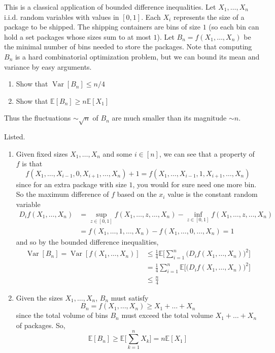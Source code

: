\documentclass{article}
\DeclareMathOperator{\Var}{Var}
\theoremstyle{definition}
\theoremstyle{remark}
\theoremstyle{definition}
\begin{document}
  \begin{exercise}
  This is a classical application of bounded difference inequalities. Let $X_1, \ldots, X_n$ i.i.d. random variables with values in $[0, 1]$. Each $X_i$ represents the size of a package to be shipped. The shipping containers are bins of size $1$ (so each bin can hold a set packages whose sizes sum to at most $1$). Let $B_n = f(X_1, \ldots, X_n)$ be the minimal number of bins needed to store the packages. Note that computing $B_n$ is a hard combinatorial optimization problem, but we can bound its mean and variance by easy arguments. 
  \begin{enumerate}
      \item Show that $\Var[B_n] \leq n/4$
      \item Show that $\mathbb{E}[B_n] \geq n \mathbb{E}[X_1]$
  \end{enumerate}
  Thus the fluctuations $\sim \sqrt{n}$ of $B_n$ are much smaller than its magnitude $\sim n$. 
  \end{exercise}
  \begin{solution}
  Listed. 
  \begin{enumerate}
      \item Given fixed sizes $X_1, \ldots, X_n$ and some $i \in [n]$, we can see that a property of $f$ is that 
      \[f(X_1, \ldots, X_{i-1}, 0, X_{i+1}, \ldots, X_n) + 1 = f(X_1, \ldots, X_{i-1}, 1, X_{i+1}, \ldots, X_n)\]
      since for an extra package with size $1$, you would for sure need one more bin. So the maximum difference of $f$ based on the $x_i$ value is the constant random variable 
      \begin{align*}
          D_i f(X_1, \ldots, X_n) & = \sup_{z \in [0, 1]} f(X_1, \ldots, z, \ldots, X_n) - \inf_{z \in [0, 1]} f(X_1, \ldots, z, \ldots, X_n)\\
          & = f(X_1, \ldots, 1, \ldots, X_n) - f(X_1, \ldots, 0, \ldots, X_n) = 1
      \end{align*}
      and so by the bounded difference inequalities, 
      \begin{align*}
          \Var[B_n] = \Var[f(X_1, \ldots, X_n)] & \leq \frac{1}{4} \mathbb{E} \bigg[ \sum_{i=1}^n \big( D_i f(X_1, \ldots, X_n) \big)^2 \bigg] \\
          & = \frac{1}{4} \sum_{i=1}^n \mathbb{E} \big[ \big( D_i f(X_1, \ldots, X_n) \big)^2 \big] \\
          & \leq \frac{n}{4} 
      \end{align*}
      \item Given the sizes $X_1, \ldots, X_n$, $B_n$ must satisfy 
      \[B_n = f(X_1, \ldots, X_n) \geq X_1 + \ldots + X_n\] 
      since the total volume of bins $B_n$ must exceed the total volume $X_1 + \ldots + X_n$ of packages. So, 
      \[\mathbb{E}[B_n] \geq \mathbb{E}\bigg[ \sum_{k=1}^n X_k \bigg] = n \mathbb{E}[X_1]\]
  \end{enumerate}
  \end{solution}
\end{document}
